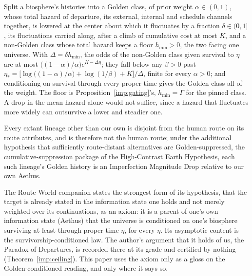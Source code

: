 \begin{theorem}\label{imp:emergence}
Split a biosphere's histories into a Golden class, of prior weight
$\alpha\in(0,1)$, whose total hazard of departure, its external,
internal and schedule channels together, is lowered at the center about
which it fluctuates by a fraction $\delta\in(0,1]$, its fluctuations
carried along, after a climb of cumulative cost at most $K$, and a
non-Golden class whose total hazard keeps a floor $h_{\min}>0$, the two
facing one universe. With $\Delta=\delta h_{\min}$, the odds of the
non-Golden class given survival to $\eta$ are at most
$\bigl((1-\alpha)/\alpha\bigr)e^{K-\Delta\eta}$; they fall below any
$\beta>0$ past
$\eta_\ast=\bigl[\log\bigl((1-\alpha)/\alpha\bigr)+\log(1/\beta)+K\bigr]/\Delta$,
finite for every $\alpha>0$; and conditioning on survival through every
proper time gives the Golden class all of the weight. The floor is
Proposition~\ref{imp:gating}'s, $h_{\min}=\Gamma$ for the pinned class.
A drop in the mean hazard alone would not suffice, since a hazard that
fluctuates more widely can outsurvive a lower and steadier one.
\end{theorem}

\begin{lemma}
\label{imp:condimd}
Every extant lineage other than our own is disjoint from the human
route on its route attributes, and is therefore not the human route;
under the additional hypothesis that sufficiently route-distant
alternatives are Golden-suppressed, the cumulative-suppression package
of the High-Contrast Earth Hypothesis, each such lineage's Golden
history is an Imperfection Magnitude Drop relative to our own Aethus.
\end{lemma}

\begin{definition}\label{imp:goldenaxiom}
The Route World companion states the strongest form of its hypothesis,
that the target is already stated in the information state one holds
and not merely weighted over its continuations, as an axiom: it is a
parent of one's own information state (Aethus) that the universe is
conditioned on one's biosphere surviving at least through proper time
$\eta$, for every $\eta$. Its asymptotic content is the
survivorship-conditioned law. The author's argument that it holds of
us, the Paradox of Departures, is recorded there at its grade and
certified by nothing (Theorem~\ref{imp:ceiling}). This paper uses the
axiom only as a gloss on the Golden-conditioned reading, and only where
it says so.
\end{definition}


